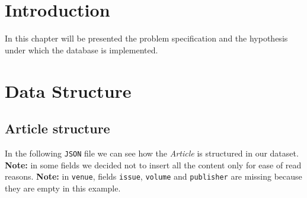\documentclass{Configuration_Files/PoliMi3i_thesis}
\begin{document}
\mainmatter %

\chapter{Introduction}
\label{ch:introduction}
In this chapter will be presented the problem specification and the hypothesis under which the database is implemented.


\chapter{Data Structure}
\label{ch:data_struct}
\section{Article structure}
In the following \verb |JSON| file we can see how the \emph{Article} is structured in our dataset.\newline
\textbf{Note:} in some fields we decided not to insert all the content only for ease of read reasons.\newline
\textbf{Note:} in \verb |venue|, fields \verb |issue|, \verb |volume| and \verb |publisher| are missing because they are empty in this example.
\end{document}
